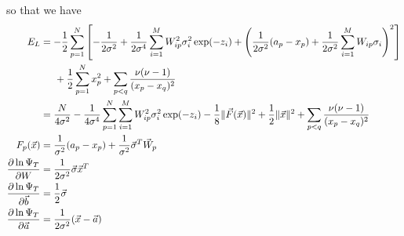 \documentclass[12pt]{article}
\begin{document}
\noindent so that we have
\begin{align*}
E_L &= -\frac{1}{2} \sum_{p=1}^{N} \left[   -\frac{1}{2 \sigma^2}
+ \frac{1}{2\sigma^4} \sum_{i=1}^M W_{ip}^2 \sigma_i^2 \exp(-z_i)
+ \left( \frac{1}{2\sigma^2} (a_p-x_p) + \frac{1}{2\sigma^2} \sum_{i=1}^M W_{ip} \sigma_i \right)^2 \right]\\
& \hspace{5mm} + \frac{1}{2} \sum_{p=1}^{N} x_p^2 + \sum_{p<q} \frac{\nu (\nu -1)}{(x_p-x_q)^2} \\
&=\frac{N}{4 \sigma^2}
-\frac{1}{4\sigma^4} \sum_{p=1}^N \sum_{i=1}^M W_{ip}^2 \sigma_i^2 \exp(-z_i) 
-\frac{1}{8} \| \vec{F}(\vec{x}) \|^2
+ \frac{1}{2}\| \vec{x} \|^2 + \sum_{p<q} \frac{\nu (\nu -1)}{(x_p-x_q)^2} \\
F_p(\vec{x}) &= \frac{1}{\sigma^2} (a_p-x_p) + \frac{1}{\sigma^2}\vec{\sigma}^T \vec{W}_p\\
\frac{\partial \ln \Psi_T}{\partial W} 
&= \frac{1}{2\sigma^2} \vec{\sigma} \vec{x}^T\\
\frac{\partial \ln \Psi_T}{\partial \vec{b}} &= \frac{1}{2}\vec{\sigma}\\
\frac{\partial \ln \Psi_T}{\partial \vec{a}} &= \frac{1}{2\sigma^2}(\vec{x}-\vec{a}) 
\end{align*}
\end{document}
